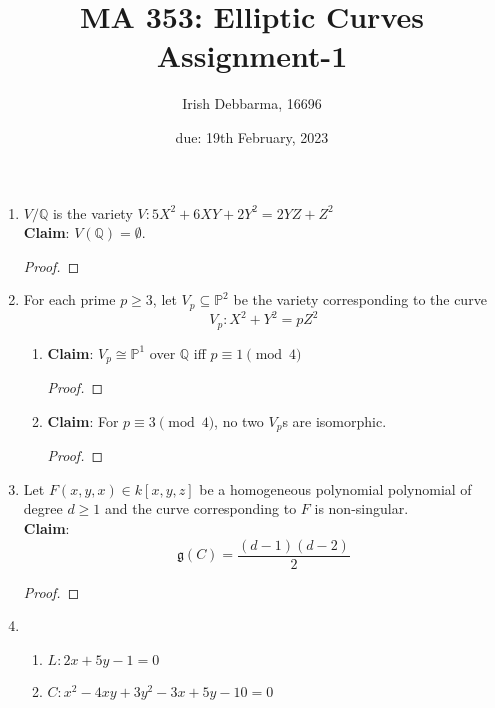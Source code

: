 \documentclass[oneside, 12pt, ]{article}
\title{MA 353: Elliptic Curves \\ Assignment-1}
\author{Irish Debbarma, 16696}
\date{due: 19th February, 2023}
\newcommand{\QQ}{\mathbb Q}
\newcommand{\PP}{\mathbb P}
\begin{document}
\maketitle

\begin{enumerate}
\item $V/\QQ$ is the variety $V: 5X^2 + 6XY + 2Y^2 = 2YZ + Z^2$ \\

\textbf{Claim}: $V(\QQ) = \emptyset$. 
\begin{proof}

\end{proof}

\item For each prime $p\geq 3$, let $V_{p} \subseteq \PP^2$ be the variety corresponding to the curve $$V_{p}: X^2 + Y^2 = pZ^2$$

\begin{enumerate}
\item \textbf{Claim}: $V_{p} \cong \PP^1 $ over $\QQ$ iff $p \equiv 1 \pmod{4}$
\begin{proof}

\end{proof}

\item \textbf{Claim}: For $p \equiv 3 \pmod{4}$, no two $V_{p}$s are isomorphic.
\begin{proof}

\end{proof}
\end{enumerate}

\item Let $F(x,y,x) \in k[x,y,z]$ be a homogeneous polynomial polynomial of degree $d\geq 1$ and the curve corresponding to $F$ is non-singular. \\

\textbf{Claim}: 
\begin{equation*}
\mathfrak{g}(C) = \frac{(d-1)(d-2)}{2}
\end{equation*} 

\begin{proof}

\end{proof}

\item 
\begin{enumerate}
\item $L : 2x+5y-1=0$


\item $C : x^2 -4xy + 3y^2 -3x + 5y - 10=0$
\end{enumerate}


\end{enumerate}
\end{document}
